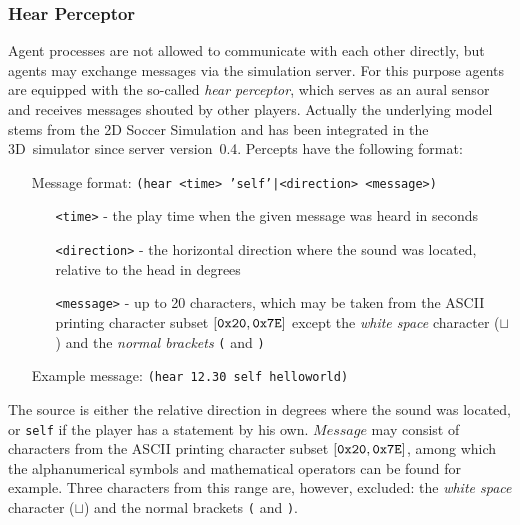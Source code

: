 \subsubsection{Hear Perceptor}
\label{sec:hearperceptor}
Agent processes are not allowed to communicate with each other directly, but
agents may exchange messages via the simulation server. For this purpose
agents are equipped with the so-called \emph{hear perceptor}, which serves as
an aural sensor and receives messages shouted by other players. Actually the
underlying model stems from the 2D Soccer Simulation and has been integrated 
in the 3D~simulator since server version~0.4. Percepts have the following format:
\begin{itemize}
	\item[Message format:] \texttt{(hear <time>	'self'|<direction> <message>)}
		\begin{itemize}
	  	  \item[\texttt{<time>} -] the play time when the given message was heard
	  	  in seconds
	  	  \item[\texttt{<direction>} -] the horizontal direction where the sound was
	  	  located, relative to the head in degrees
		  \item[\texttt{<message>} -] up to 20 characters, which may be taken
		  from the ASCII  printing character subset $[{\tt 0x20}, {\tt 0x7E]}$ except
		  the {\it white space}  character ($\sqcup$) and the {\it normal brackets}
		  {\tt(} and {\tt )}
		\end{itemize}
	\item[Example message:]	\texttt{(hear 12.30 self helloworld)}
\end{itemize}
The source is either the relative direction in degrees where the sound was
located, or {\tt self} if the player has a statement by his own. $Message$ may
consist of characters from the ASCII printing character subset \mbox{$[{\tt
0x20}, {\tt 0x7E]}$}, among which the alphanumerical symbols and mathematical
operators can be found for example. Three characters from this range are,
however, excluded: the {\it white space} character ($\sqcup$) and the normal
brackets {\tt(} and {\tt )}.

